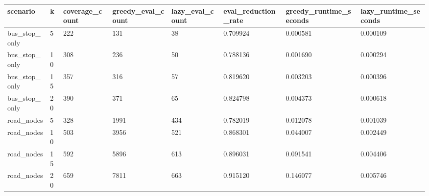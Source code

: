 \begin{tabular}{llllllll}
\hline
scenario & k & coverage_count & greedy_eval_count & lazy_eval_count & eval_reduction_rate & greedy_runtime_seconds & lazy_runtime_seconds \\
\hline
bus_stop_only & 5 & 222 & 131 & 38 & 0.709924 & 0.000581 & 0.000109 \\
bus_stop_only & 10 & 308 & 236 & 50 & 0.788136 & 0.001690 & 0.000294 \\
bus_stop_only & 15 & 357 & 316 & 57 & 0.819620 & 0.003203 & 0.000396 \\
bus_stop_only & 20 & 390 & 371 & 65 & 0.824798 & 0.004373 & 0.000618 \\
road_nodes & 5 & 328 & 1991 & 434 & 0.782019 & 0.012078 & 0.001039 \\
road_nodes & 10 & 503 & 3956 & 521 & 0.868301 & 0.044007 & 0.002449 \\
road_nodes & 15 & 592 & 5896 & 613 & 0.896031 & 0.091541 & 0.004406 \\
road_nodes & 20 & 659 & 7811 & 663 & 0.915120 & 0.146077 & 0.005746 \\
\hline
\end{tabular}

